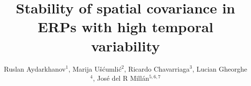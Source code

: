 \documentclass[12pt]{iopart}
\begin{document}
\title[]{Stability of spatial covariance in ERPs with high temporal variability}

\author{Ruslan Aydarkhanov$^1$,
Marija U\v{s}\'{c}umli\'{c}$^2$,
Ricardo Chavarriaga$^3$,
Lucian Gheorghe$^4$,
Jos\'e del R Mill\'an$^{5,6,7}$}


\address{$^1$Medical Image Processing Laboratory,
Center for Neuroprosthetics,
Interschool Institute of Bioengineering,
\'Ecole Polytechnique F\'ed\'erale de Lausanne (EPFL),
Campus Biotech H4,
1202 Geneva,
Switzerland}
\address{$^2$Nissan International SA,
La Pi\`ece 12,
1180 Rolle,
Switzerland
}
\address{$^3$Zurich University of Applied Sciences, ZHAW,
InIT Institut of Applied Information Technology,
Ob. Kirchgasse 2,
8400 Winterthur,
Switzerland}

\address{$^4$
Advanced Materials and Processing Laboratory, Nissan Research Center, Nissan Motors Co. LTD, 1,
Natsushima, Yokosuka-shi, Kanagawa-ken, 237-8523, Japan
}
\address{$^5$Dept. of Electrical and Computer Engineering,
The University of Texas at Austin,
Austin, TX 78712,
USA}
\address{$^6$Dept. of Neurology,
The University of Texas at Austin,
Austin, TX 78712,
USA}
\address{$^7$\'Ecole Polytechnique F\'ed\'erale de Lausanne (EPFL),
Campus Biotech H4,
1202 Geneva,
 Switzerland}
\vspace{10pt}
\end{document}
